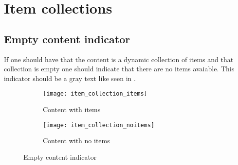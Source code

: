 
\chapter{Item collections}


\section{Empty content indicator}
\label{sec:empty_content_indicator}


If one should have that the content is a dynamic collection of items and that collection is empty one should indicate that there are no items avaiable. This indicator should be a gray text  like seen in .

\begin{figure}
    \centering
    \begin{subfigure}[t]{0.4\textwidth}
        \centering
        \texttt{[image: item\_collection\_items]}
        \caption{Content with items}
        \label{fig:empty_content_items}
    \end{subfigure}
    \hspace{5em} 
    \begin{subfigure}[t]{0.4\textwidth}
        \centering
        \texttt{[image: item\_collection\_noitems]}
        \caption{Content with no items}
        \label{fig:empty_content_noitems}
    \end{subfigure}
    
    \caption{Empty content indicator}
    \label{fig:empty_content}
\end{figure}




